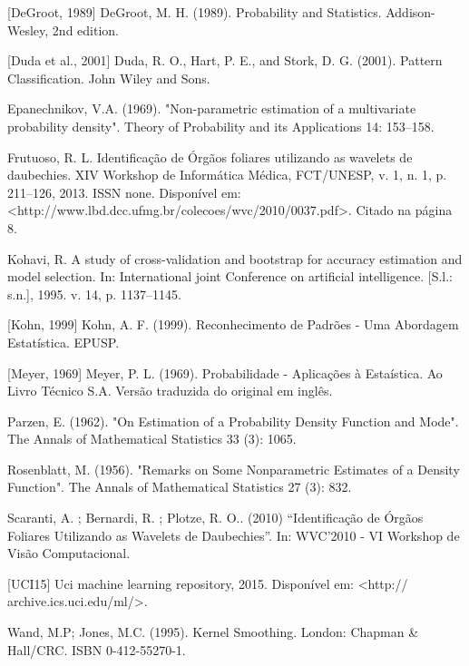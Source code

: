 \documentclass[preprint,12pt]{elsarticle}
\begin{document}
\begin{thebibliography}{01}



[DeGroot, 1989] DeGroot, M. H. (1989). Probability and Statistics. Addison-Wesley, 2nd edition.

[Duda et al., 2001] Duda, R. O., Hart, P. E., and Stork, D. G. (2001). Pattern Classification. John Wiley and Sons.

Epanechnikov, V.A. (1969). "Non-parametric estimation of a multivariate probability density". Theory of Probability and its Applications 14: 153–158.

Frutuoso, R. L. Identificação de Órgãos foliares utilizando as wavelets de daubechies. XIV Workshop de Informática Médica, FCT/UNESP, v. 1, n. 1, p. 211–126, 2013. ISSN none. Disponível em: <http://www.lbd.dcc.ufmg.br/colecoes/wvc/2010/0037.pdf>. Citado na página 8.

Kohavi, R. A study of cross-validation and bootstrap for accuracy estimation and model selection. In: International joint Conference on artificial intelligence. [S.l.: s.n.], 1995. v. 14, p. 1137–1145.

[Kohn, 1999] Kohn, A. F. (1999). Reconhecimento de Padrões - Uma Abordagem Estatística. EPUSP.

[Meyer, 1969] Meyer, P. L. (1969). Probabilidade - Aplicações à Estaística. Ao Livro Técnico S.A. Versão traduzida do original em inglês.

Parzen, E. (1962). "On Estimation of a Probability Density Function and Mode". The Annals of Mathematical Statistics 33 (3): 1065.

Rosenblatt, M. (1956). "Remarks on Some Nonparametric Estimates of a Density Function". The Annals of Mathematical Statistics 27 (3): 832.

Scaranti, A. ; Bernardi, R. ; Plotze, R. O.. (2010) “Identificação de Órgãos Foliares Utilizando as Wavelets de Daubechies”. In: WVC'2010 - VI Workshop de Visão Computacional.

[UCI15] Uci machine learning repository, 2015. Disponível em: <http:// archive.ics.uci.edu/ml/>.

Wand, M.P; Jones, M.C. (1995). Kernel Smoothing. London: Chapman \& Hall/CRC. ISBN 0-412-55270-1.


\end{thebibliography}
\end{document}
